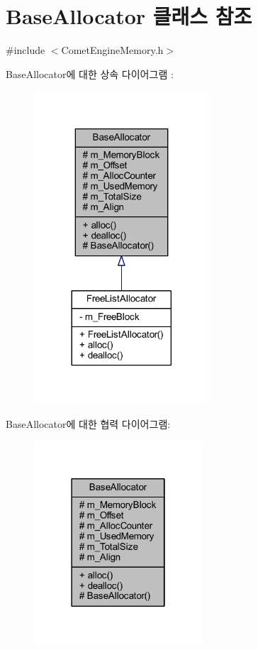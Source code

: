\hypertarget{class_comet_engine_1_1_core_1_1_memory_1_1_base_allocator}{}\section{Base\+Allocator 클래스 참조}
\label{class_comet_engine_1_1_core_1_1_memory_1_1_base_allocator}


{\ttfamily \#include $<$Comet\+Engine\+Memory.\+h$>$}



Base\+Allocator에 대한 상속 다이어그램 \+: \nopagebreak
\begin{figure}[H]
\begin{center}
\leavevmode
\includegraphics[width=185pt]{class_comet_engine_1_1_core_1_1_memory_1_1_base_allocator__inherit__graph}
\end{center}
\end{figure}


Base\+Allocator에 대한 협력 다이어그램\+:\nopagebreak
\begin{figure}[H]
\begin{center}
\leavevmode
\includegraphics[width=178pt]{class_comet_engine_1_1_core_1_1_memory_1_1_base_allocator__coll__graph}
\end{center}
\end{figure}
